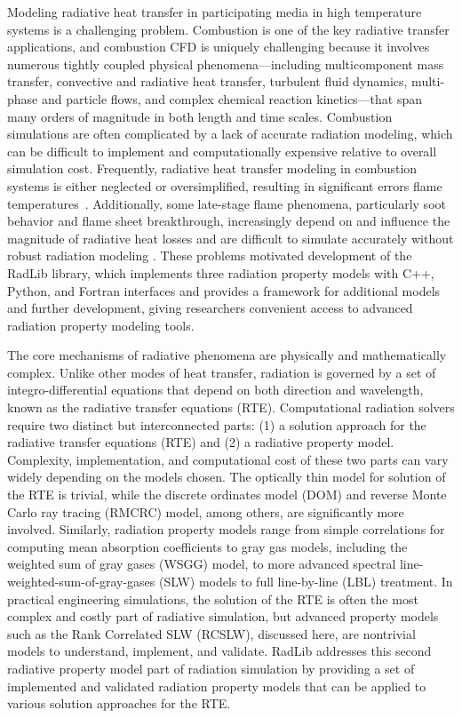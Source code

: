 \documentclass[preprint,12pt]{elsarticle}
\begin{document}
Modeling radiative heat transfer in participating media in high temperature systems is a challenging problem. Combustion is one of the key radiative transfer applications, and combustion CFD is uniquely challenging because it involves numerous tightly coupled physical phenomena---including multicomponent mass transfer, convective and radiative heat transfer, turbulent fluid dynamics, multi-phase and particle flows, and complex chemical reaction kinetics---that span many orders of magnitude in both length and time scales. Combustion simulations are often complicated by a lack of accurate radiation modeling, which can be difficult to implement and computationally expensive relative to overall simulation cost. Frequently, radiative heat transfer modeling in combustion systems is either neglected or oversimplified, resulting in significant errors flame temperatures~\citep{Modest_2016}. Additionally, some late-stage flame phenomena, particularly soot behavior and flame sheet breakthrough, increasingly depend on and influence the magnitude of radiative heat losses and are difficult to simulate accurately without robust radiation modeling \cite{Modest_2013}. These problems motivated development of the RadLib library, which implements three radiation property models with C++, Python, and Fortran interfaces and provides a framework for additional models and further development, giving researchers convenient access to advanced radiation property modeling tools.

The core mechanisms of radiative phenomena are physically and mathematically complex. Unlike other modes of heat transfer, radiation is governed by a set of integro-differential equations that depend on both direction and wavelength, known as the radiative transfer equations (RTE). Computational radiation solvers require two distinct but interconnected parts: (1) a solution approach for the radiative transfer equations (RTE) and (2) a radiative property model. 
Complexity, implementation, and computational cost of these two parts can vary widely depending on the models chosen. The optically thin model for solution of the RTE is trivial, while the discrete ordinates model (DOM) and reverse Monte Carlo ray tracing (RMCRC) model, among others, are significantly more involved. Similarly, radiation property models range from simple correlations for computing mean absorption coefficients to gray gas models, including the weighted sum of gray gases (WSGG) model, to more advanced spectral line-weighted-sum-of-gray-gases (SLW) models to full line-by-line (LBL) treatment. In practical engineering simulations, the solution of the RTE is often the most complex and costly part of radiative simulation, but advanced property models such as the Rank Correlated SLW (RCSLW), discussed here, are nontrivial models to understand, implement, and validate.
RadLib addresses this second radiative property model part of radiation simulation by providing a set of implemented and validated radiation property models that can be applied to various solution approaches for the RTE.
\end{document}
